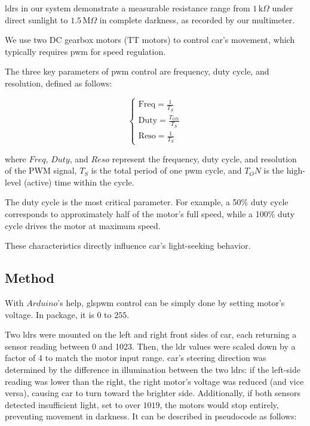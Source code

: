 \documentclass[../main]{subfiles}
\begin{document}
\gls{ldr}s in our system demonstrate a measurable resistance range
from $1\,\text{k}\Omega$ under direct sunlight to $1.5\,\text{M}\Omega$ in complete darkness,
as recorded by our multimeter.

We use two DC gearbox motors (TT motors) to control \gls{car}'s movement, 
which typically requires \gls{pwm} for speed regulation.

The three key parameters of \gls{pwm} control are frequency, duty cycle, and resolution, 
defined as follows:

\begin{equation}
  \begin{cases}
    \text{Freq} = \frac{1}{T_S} \\
    \text{Duty} = \frac{T_{\text{ON}}}{T_S} \\
    \text{Reso} = \frac{1}{T_S}
  \end{cases}
\end{equation}

where $Freq$, $Duty$, and $Reso$ represent the frequency, duty cycle, and resolution of the PWM signal,
$T_S$ is the total period of one \gls{pwm} cycle, and
$T_ON$ is the high-level (active) time within the cycle.

The duty cycle is the most critical parameter. 
For example, a 50\% duty cycle corresponds to approximately half of the motor's full speed, while
a 100\% duty cycle drives the motor at maximum speed.

These characteristics directly influence \gls{car}'s light-seeking behavior.

\subsection{Method}

With $Arduino$'s help, gls{pwm} control can be simply done by setting motor's voltage.
In package, it is $0$ to $255$.

Two \gls{ldr}s were mounted on the left and right front sides of \gls{car},
each returning a sensor reading between 0 and 1023.
Then, the \gls{ldr} values were scaled down by a factor of 4 to match the motor input range.
\gls{car}’s steering direction was determined by the difference in illumination between the two \gls{ldr}s:
if the left-side reading was lower than the right, the right motor’s voltage was reduced (and vice versa),
causing \gls{car} to turn toward the brighter side.
Additionally, if both sensors detected insufficient light, set to over $1019$,
the motors would stop entirely, preventing movement in darkness.
It can be described in pseudocode as follows:
\end{document}
